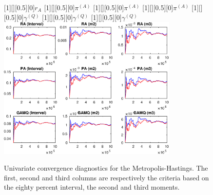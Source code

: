  
\begin{figure}[H]
[1][][0.5][0]{$ {r_{A}} $}
[1][][0.5][0]{$ {\pi^{(A)}} $}
[1][][0.5][0]{$ {\pi^{(A)}} $}
[1][][0.5][0]{$ {\pi^{(A)}} $}
[1][][0.5][0]{$ {\gamma^{(Q)}} $}
[1][][0.5][0]{$ {\gamma^{(Q)}} $}
[1][][0.5][0]{$ {\gamma^{(Q)}} $}
\centering 
\includegraphics[width=0.80\textwidth]{AnSchoModTheBuilder/Output/AnSchoModTheBuilder_udiag1}
\caption{Univariate convergence diagnostics for the Metropolis-Hastings.
The first, second and third columns are respectively the criteria based on
the eighty percent interval, the second and third moments.}\label{Fig:UnivariateDiagnostics:1}
\end{figure}

